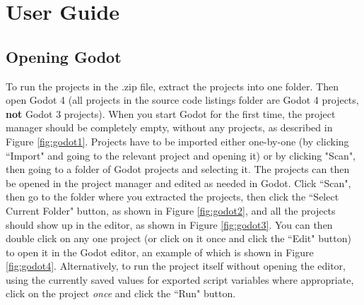 \chapter{User Guide} \label{Guide}

\section{Opening Godot}

To run the projects in the .zip file, extract the projects into one folder. Then open Godot 4 (all projects in the source code listings folder are Godot 4 projects, \textbf{not} Godot 3 projects). When you start Godot for the first time, the project manager should be completely empty, without any projects, as described in Figure \ref{fig:godot1}. Projects have to be imported either one-by-one (by clicking ``Import" and going to the relevant project and opening it) or by clicking "Scan", then going to a folder of Godot projects and selecting it. The projects can then be opened in the project manager and edited as needed in Godot. Click ``Scan", then go to the folder where you extracted the projects, then click the ``Select Current Folder" button, as shown in Figure \ref{fig:godot2}, and all the projects should show up in the editor, as shown in Figure \ref{fig:godot3}. You can then double click on any one project (or click on it once and click the ``Edit" button) to open it in the Godot editor, an example of which is shown in Figure \ref{fig:godot4}. Alternatively, to run the project itself without opening the editor, using the currently saved values for exported script variables where appropriate, click on the project \textit{once} and click the ``Run" button.

